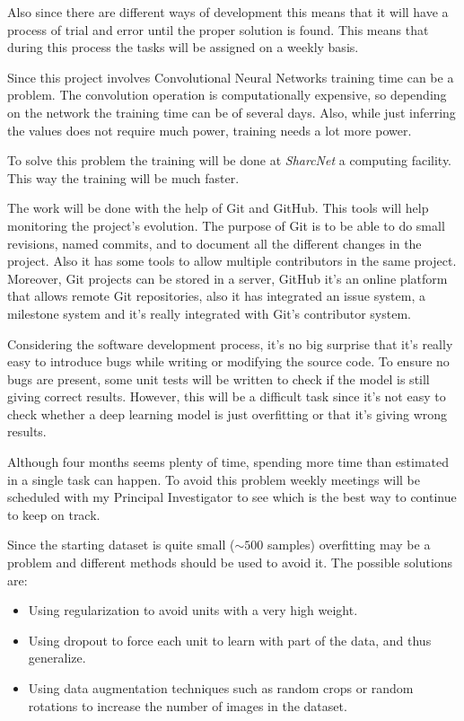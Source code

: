 Also since there are different ways of development this means that it will have a process of trial
and error until the proper solution is found. This means that during this process the
tasks will be assigned on a weekly basis.




Since this project involves Convolutional Neural Networks training time can be a problem. 
The convolution operation is computationally expensive, so depending on the network the 
training time can be of several days. Also, while just inferring the values does not require
much power, training needs a lot more power. 

To solve this problem the training will be done at \emph{SharcNet} a computing facility. 
This way the training will be much faster.


The work will be done with the help of Git and GitHub. This tools will help monitoring
the project's evolution. The purpose of Git is to be able to do small revisions,
named commits, and to document all the different changes in the project. Also it has
some tools to allow multiple contributors in the same project. Moreover,
Git projects can be stored in a server, GitHub it's an online platform that allows
remote Git repositories, also it has integrated an issue system, a milestone system
and it's really integrated with Git's contributor system.
~\cites{tool:git}{tool:github}


Considering the software development process, it's no big surprise that it's really easy to
introduce bugs while writing or modifying the source code. To ensure no bugs are present,
some unit tests will be written to check if the model is still giving correct results.
However, this will be a difficult task since it's not easy to check whether a deep 
learning model is just overfitting or that it's giving wrong results.


Although four months seems plenty of time, spending more time than estimated in a single task
can happen. To avoid this problem weekly meetings will be scheduled with my Principal Investigator
to see which is the best way to continue to keep on track.


Since the starting dataset is quite small (\( \sim 500 \) samples) overfitting may be a problem
and different methods should be used to avoid it. The possible solutions are:
\begin{itemize}
  \item Using regularization to avoid units with a very high weight.
  \item Using dropout to force each unit to learn with part of the data, and thus generalize.
  \item Using data augmentation techniques such as random crops or random rotations to increase
  the number of images in the dataset.
\end{itemize}
